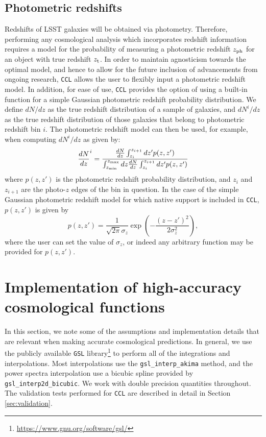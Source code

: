 \documentclass[\docopts]{\docclass}
\newcommand{\ccl}{{\tt CCL}\xspace}
\begin{document}
\subsection{Photometric redshifts}

Redshifts of LSST galaxies will be obtained via photometry. Therefore, performing any cosmological analysis which incorporates redshift information requires a model for the probability of measuring a photometric redshift $z_{\rm ph}$ for an object with true redshift $z_{\rm t}$.  In order to maintain agnosticism towards the optimal model, and hence to allow for the future inclusion of advancements from ongoing research, \ccl allows the user to flexibly input a photometric redshift model. In addition, for ease of use, \ccl provides the option of using a built-in function for a simple Gaussian photometric redshift probability distribution. We define $dN/dz$ as the true redshift distribution of a sample of galaxies, and $dN^i/dz$ as the true redshift distribution of those galaxies that belong to photometric redshift bin $i$. The photometric redshift model can then be used, for example, when computing $dN^i/dz$ as given by:
\begin{equation}
\frac{dN}{dz}^i = \frac{\frac{dN}{dz}\int_{z_i}^{z_{i+1}} dz' p(z,z')}{\int_{z_{\rm min}}^{z_{\rm max}}dz \frac{dN}{dz} \int_{z_i}^{z_{i+1}}dz' p(z, z')}
\label{photoz}
\end{equation}
where $p(z,z')$ is the photometric redshift probability distribution, and $z_{i}$ and $z_{i+1}$ are the photo-$z$ edges of the bin in question. In the case of the simple Gaussian photometric redshift model for which native support is included in \ccl , $p(z, z')$ is given by
\begin{equation}
p(z,z') = \frac{1}{\sqrt{2 \pi}\sigma_z} \exp\left(-\frac{(z-z')^2}{2\sigma_z^2}\right),
\label{pz_gauss}
\end{equation}
where the user can set the value of $\sigma_z$, or indeed any arbitrary function may be provided for $p(z,z')$.

\section{Implementation of high-accuracy cosmological functions}
\label{sec:implement}

In this section, we note some of the assumptions and implementation details that are relevant when making accurate cosmological predictions. In general, we use the publicly available {\tt GSL} library\footnote{\url{https://www.gnu.org/software/gsl/}} to perform all of the integrations and interpolations. Most interpolations use the {\tt gsl\_interp\_akima} method, and the power spectra interpolation use a bicubic spline provided by {\tt gsl\_interp2d\_bicubic}. We work with double precision quantities throughout. The validation tests performed for {\tt CCL} are described in detail in Section \ref{sec:validation}.
\end{document}
